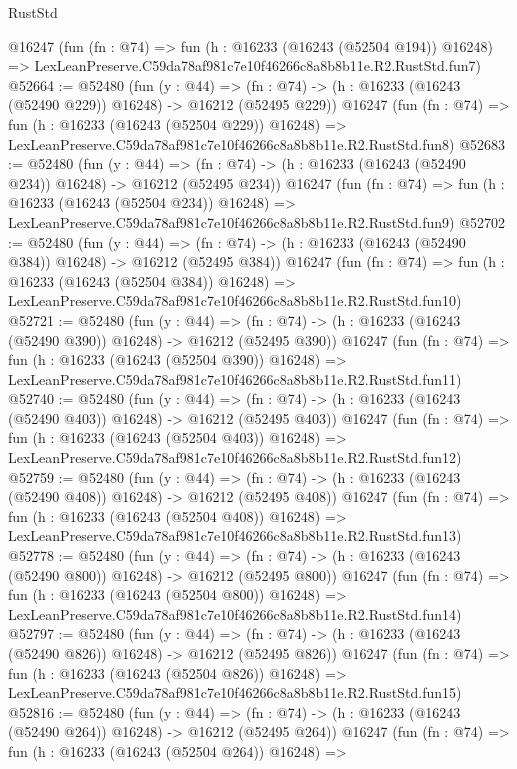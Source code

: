 \begin{lexlean}{RustStd}
\begin{coremodule}
    @16247
    (fun (fn : @74) =>
    fun (h : @16233 (@16243 (@52504 @194)) @16248) =>
    LexLeanPreserve.C59da78af981c7e10f46266c8a8b8b11e.R2.RustStd.fun7)
@52664 := @52480
    (fun (y : @44) =>
    (fn : @74) -> (h : @16233 (@16243 (@52490 @229)) @16248) -> @16212 (@52495 @229))
    @16247
    (fun (fn : @74) =>
    fun (h : @16233 (@16243 (@52504 @229)) @16248) =>
    LexLeanPreserve.C59da78af981c7e10f46266c8a8b8b11e.R2.RustStd.fun8)
@52683 := @52480
    (fun (y : @44) =>
    (fn : @74) -> (h : @16233 (@16243 (@52490 @234)) @16248) -> @16212 (@52495 @234))
    @16247
    (fun (fn : @74) =>
    fun (h : @16233 (@16243 (@52504 @234)) @16248) =>
    LexLeanPreserve.C59da78af981c7e10f46266c8a8b8b11e.R2.RustStd.fun9)
@52702 := @52480
    (fun (y : @44) =>
    (fn : @74) -> (h : @16233 (@16243 (@52490 @384)) @16248) -> @16212 (@52495 @384))
    @16247
    (fun (fn : @74) =>
    fun (h : @16233 (@16243 (@52504 @384)) @16248) =>
    LexLeanPreserve.C59da78af981c7e10f46266c8a8b8b11e.R2.RustStd.fun10)
@52721 := @52480
    (fun (y : @44) =>
    (fn : @74) -> (h : @16233 (@16243 (@52490 @390)) @16248) -> @16212 (@52495 @390))
    @16247
    (fun (fn : @74) =>
    fun (h : @16233 (@16243 (@52504 @390)) @16248) =>
    LexLeanPreserve.C59da78af981c7e10f46266c8a8b8b11e.R2.RustStd.fun11)
@52740 := @52480
    (fun (y : @44) =>
    (fn : @74) -> (h : @16233 (@16243 (@52490 @403)) @16248) -> @16212 (@52495 @403))
    @16247
    (fun (fn : @74) =>
    fun (h : @16233 (@16243 (@52504 @403)) @16248) =>
    LexLeanPreserve.C59da78af981c7e10f46266c8a8b8b11e.R2.RustStd.fun12)
@52759 := @52480
    (fun (y : @44) =>
    (fn : @74) -> (h : @16233 (@16243 (@52490 @408)) @16248) -> @16212 (@52495 @408))
    @16247
    (fun (fn : @74) =>
    fun (h : @16233 (@16243 (@52504 @408)) @16248) =>
    LexLeanPreserve.C59da78af981c7e10f46266c8a8b8b11e.R2.RustStd.fun13)
@52778 := @52480
    (fun (y : @44) =>
    (fn : @74) -> (h : @16233 (@16243 (@52490 @800)) @16248) -> @16212 (@52495 @800))
    @16247
    (fun (fn : @74) =>
    fun (h : @16233 (@16243 (@52504 @800)) @16248) =>
    LexLeanPreserve.C59da78af981c7e10f46266c8a8b8b11e.R2.RustStd.fun14)
@52797 := @52480
    (fun (y : @44) =>
    (fn : @74) -> (h : @16233 (@16243 (@52490 @826)) @16248) -> @16212 (@52495 @826))
    @16247
    (fun (fn : @74) =>
    fun (h : @16233 (@16243 (@52504 @826)) @16248) =>
    LexLeanPreserve.C59da78af981c7e10f46266c8a8b8b11e.R2.RustStd.fun15)
@52816 := @52480
    (fun (y : @44) =>
    (fn : @74) -> (h : @16233 (@16243 (@52490 @264)) @16248) -> @16212 (@52495 @264))
    @16247
    (fun (fn : @74) =>
    fun (h : @16233 (@16243 (@52504 @264)) @16248) =>

\end{coremodule}
\end{lexlean}
